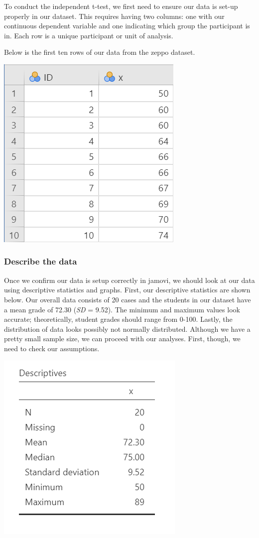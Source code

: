 \documentclass[
]{book}
\begin{document}
To conduct the independent t-test, we first need to ensure our data is set-up properly in our dataset. This requires having two columns: one with our continuous dependent variable and one indicating which group the participant is in. Each row is a unique participant or unit of analysis.

Below is the first ten rows of our data from the zeppo dataset.

\includegraphics{images/07.1-one_sample_t-test/data.png}

\hypertarget{describe-the-data}{%
\subsubsection{Describe the data}\label{describe-the-data}}

Once we confirm our data is setup correctly in jamovi, we should look at our data using descriptive statistics and graphs. First, our descriptive statistics are shown below. Our overall data consists of 20 cases and the students in our dataset have a mean grade of 72.30 (\emph{SD} = 9.52). The minimum and maximum values look accurate; theoretically, student grades should range from 0-100. Lastly, the distribution of data looks possibly not normally distributed. Although we have a pretty small sample size, we can proceed with our analyses. First, though, we need to check our assumptions.

\includegraphics{images/07.1-one_sample_t-test/descriptives.png}
\end{document}

